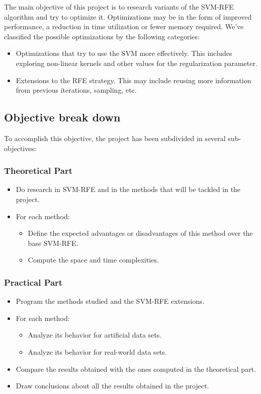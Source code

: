 The main objective of this project is to research variants of the SVM-RFE algorithm and try to optimize it. Optimizations may be in the form of improved performance, a reduction in time utilization or fewer memory required. We've classified the possible optimizations by the following categories:

\begin{itemize}
    \item Optimizations that try to use the SVM more effectively. This includes exploring non-linear kernels and other values for the regularization parameter.
    \item Extensions to the RFE strategy. This may include reusing more information from previous iterations, sampling, etc. 
\end{itemize}

\subsection{Objective break down}

To accomplish this objective, the project has been subdivided in several sub-objectives:

\subsubsection*{Theoretical Part}

\begin{itemize}
    \item Do research in SVM-RFE and in the methods that will be tackled in the project.
    \item {
        For each method:
        \begin{itemize}
            \item Define the expected advantages or disadvantages of this method over the base SVM-RFE.
            \item Compute the space and time complexities.
        \end{itemize}
    }
\end{itemize}

\subsubsection*{Practical Part}

\begin{itemize}
    \item Program the methods studied and the SVM-RFE extensions.
    \item {
        For each method:
        \begin{itemize}
            \item Analyze its behavior for artificial data sets.
            \item Analyze its behavior for real-world data sets.
        \end{itemize}
    }
    \item Compare the results obtained with the ones computed in the theoretical part.
    \item Draw conclusions about all the results obtained in the project.
\end{itemize}

